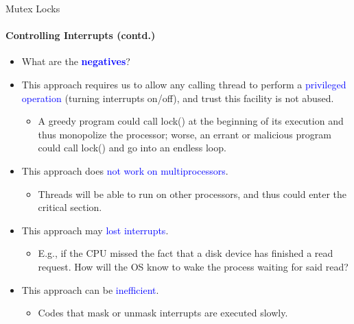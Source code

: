 \documentclass[10pt]{beamer}
\begin{document}
\begin{frame}{Mutex Locks}
\framesubtitle{Controlling Interrupts (contd.)}
\begin{itemize}
 
\item What are the \textbf{\textcolor{blue}{negatives}}?
\item This approach requires us to allow any calling thread to perform a \textcolor{blue}{privileged operation} (turning interrupts on/off), and trust this facility is not abused.
\begin{itemize}
 
\item A greedy program could call lock() at the beginning of its execution and thus monopolize the processor; worse, an errant or malicious program could call lock() and go into an endless loop.
\end{itemize}
\item This approach does \textcolor{blue}{not work on multiprocessors}.
\begin{itemize}
 
\item Threads will be able to run on other processors, and thus could enter the critical section.
\end{itemize}
\item This approach may \textcolor{blue}{lost interrupts}.
\begin{itemize}
 
\item E.g., if the CPU missed the fact that a disk device has finished a read request. How will the OS know to wake the process waiting for said read?
\end{itemize}
\item This approach can be \textcolor{blue}{inefficient}.
\begin{itemize}
 
\item Codes that mask or unmask interrupts are executed slowly.
\end{itemize}
\end{itemize}
\end{frame}
\end{document}

